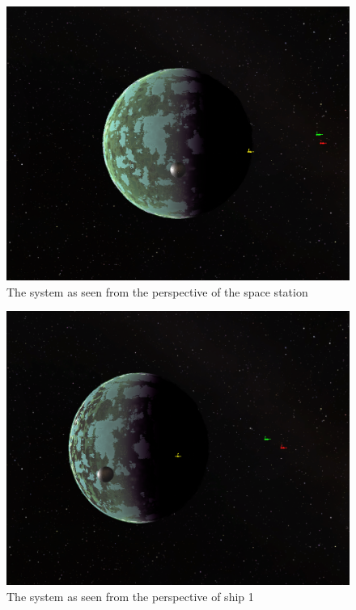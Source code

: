 \documentclass[reprint,english,notitlepage]{revtex4-2}
\begin{document}
  \begin{figure}[h!]
    \centering
    \includegraphics[scale = .125]{figures/Station_perspective.png}
    \caption{The system as seen from the perspective of the space station}
    \label{fig: Situation Station}
  \end{figure}
  \begin{figure}[h!]
    \centering
    \includegraphics[scale = .125]{figures/1_perspective.png}
    \caption{The system as seen from the perspective of ship 1}
    \label{fig: Situation 1}
  \end{figure}
\end{document}
